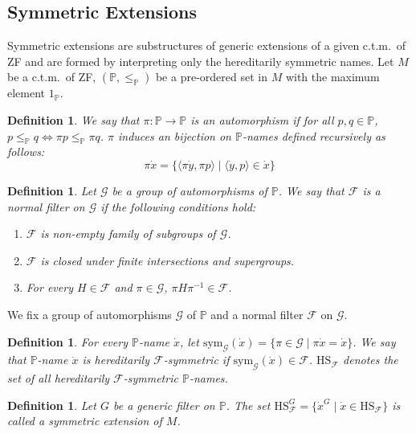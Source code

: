 \documentclass{report}
\newtheorem{dfn}[thm]{Definition}
\newcommand{\Pbb}{\mathbb{P}}
\newcommand{\Gcal}{\mathcal{G}}
\newcommand{\Fcal}{\mathcal{F}}
\newcommand{\ctm}{c.t.m.\ }
\begin{document}
\subsection{Symmetric Extensions}
Symmetric extensions are substructures of generic extensions of a given \ctm of ZF 
and are formed by interpreting only the hereditarily symmetric names.
Let $M$ be a \ctm of ZF, $(\Pbb, \leq_{\Pbb})$ be a pre-ordered set in $M$ with the maximum element $1_{\Pbb}$.

\begin{dfn} 
  We say that $\pi : \Pbb \rightarrow \Pbb$ is an \emph{automorphism} if for all $p, q \in \Pbb$, $p \leq_{\Pbb} q \Leftrightarrow \pi p \leq_{\Pbb} \pi q$.
  $\pi$ induces an bijection on $\Pbb$-names defined recursively as follows:
  $$ \pi \dot{x} = \{ \langle \pi \dot{y}, \pi p \rangle \mid \langle \dot{y}, p \rangle \in \dot{x} \} $$
\end{dfn}

\begin{dfn} %
  Let $\Gcal$ be a group of automorphisms of $\Pbb$. We say that $\Fcal$ is a \emph{normal filter} on $\Gcal$ if the following conditions hold:
  \begin{enumerate}
    \item $\Fcal$ is non-empty family of subgroups of $\Gcal$.
    \item $\Fcal$ is closed under finite intersections and supergroups.
    \item For every $H \in \Fcal$ and $\pi \in \Gcal$, $\pi H \pi^{-1} \in \Fcal$.
  \end{enumerate}
\end{dfn}

We fix a group of automorphisms $\Gcal$ of $\Pbb$ and a normal filter $\Fcal$ on $\Gcal$.
\begin{dfn} 
  For every $\Pbb$-name $\dot{x}$, let $\mathrm{sym}_{\Gcal}(\dot{x}) = \{ \pi \in \Gcal \mid \pi \dot{x} = \dot{x} \}$.
  We say that $\Pbb$-name $\dot{x}$ is \emph{hereditarily $\Fcal$-symmetric} if $\mathrm{sym}_{\Gcal}(\dot{x}) \in \Fcal$.
  $\mathrm{HS}_{\Fcal}$ denotes the set of all hereditarily $\Fcal$-symmetric $\Pbb$-names.
\end{dfn}

\begin{dfn} 
  Let $G$ be a generic filter on $\Pbb$. The set $\mathrm{HS}^{G}_{\Fcal} = \{ \dot{x}^G \mid \dot{x} \in \mathrm{HS}_{\Fcal} \}$ is called a \emph{symmetric extension} of $M$.
\end{dfn}
\end{document}

